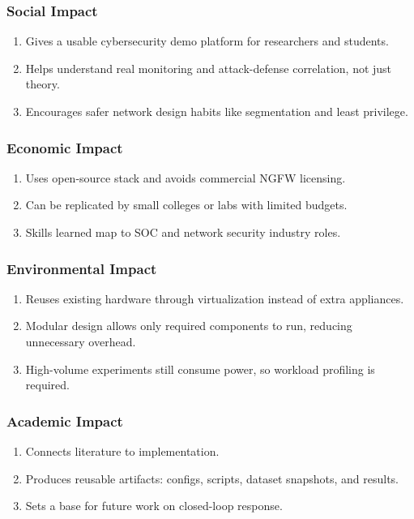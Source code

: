 \documentclass[12pt,a4paper]{article}
\begin{document}
\subsubsection{Social Impact}
\begin{enumerate}
    \item Gives a usable cybersecurity demo platform for researchers and students.
    \item Helps understand real monitoring and attack-defense correlation, not just theory.
    \item Encourages safer network design habits like segmentation and least privilege.
\end{enumerate}

\subsubsection{Economic Impact}
\begin{enumerate}
    \item Uses open-source stack and avoids commercial NGFW licensing.
    \item Can be replicated by small colleges or labs with limited budgets.
    \item Skills learned map to SOC and network security industry roles.
\end{enumerate}

\subsubsection{Environmental Impact}
\begin{enumerate}
    \item Reuses existing hardware through virtualization instead of extra appliances.
    \item Modular design allows only required components to run, reducing unnecessary overhead.
    \item High-volume experiments still consume power, so workload profiling is required.
\end{enumerate}

\subsubsection{Academic Impact}
\begin{enumerate}
    \item Connects literature to implementation.
    \item Produces reusable artifacts: configs, scripts, dataset snapshots, and results.
    \item Sets a base for future work on closed-loop response.
\end{enumerate}
\end{document}

